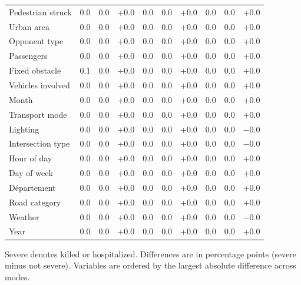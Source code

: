 \begin{table}[tp]
\begin{threeparttable}
{\begin{tabular}{lrrrrrrrrr}
Pedestrian struck & 0.0 & 0.0 & +0.0 & 0.0 & 0.0 & +0.0 & 0.0 & 0.0 & +0.0 \\
Urban area & 0.0 & 0.0 & +0.0 & 0.0 & 0.0 & +0.0 & 0.0 & 0.0 & +0.0 \\
Opponent type & 0.0 & 0.0 & +0.0 & 0.0 & 0.0 & +0.0 & 0.0 & 0.0 & +0.0 \\
Passengers & 0.0 & 0.0 & +0.0 & 0.0 & 0.0 & +0.0 & 0.0 & 0.0 & +0.0 \\
Fixed obstacle & 0.1 & 0.0 & +0.0 & 0.0 & 0.0 & +0.0 & 0.0 & 0.0 & +0.0 \\
Vehicles involved & 0.0 & 0.0 & +0.0 & 0.0 & 0.0 & +0.0 & 0.0 & 0.0 & +0.0 \\
Month & 0.0 & 0.0 & +0.0 & 0.0 & 0.0 & +0.0 & 0.0 & 0.0 & +0.0 \\
Transport mode & 0.0 & 0.0 & +0.0 & 0.0 & 0.0 & +0.0 & 0.0 & 0.0 & +0.0 \\
Lighting & 0.0 & 0.0 & +0.0 & 0.0 & 0.0 & +0.0 & 0.0 & 0.0 & $-$0.0 \\
Intersection type & 0.0 & 0.0 & +0.0 & 0.0 & 0.0 & +0.0 & 0.0 & 0.0 & $-$0.0 \\
Hour of day & 0.0 & 0.0 & +0.0 & 0.0 & 0.0 & +0.0 & 0.0 & 0.0 & +0.0 \\
Day of week & 0.0 & 0.0 & +0.0 & 0.0 & 0.0 & +0.0 & 0.0 & 0.0 & +0.0 \\
Département & 0.0 & 0.0 & +0.0 & 0.0 & 0.0 & +0.0 & 0.0 & 0.0 & +0.0 \\
Road category & 0.0 & 0.0 & +0.0 & 0.0 & 0.0 & +0.0 & 0.0 & 0.0 & +0.0 \\
Weather & 0.0 & 0.0 & +0.0 & 0.0 & 0.0 & +0.0 & 0.0 & 0.0 & $-$0.0 \\
Year & 0.0 & 0.0 & +0.0 & 0.0 & 0.0 & +0.0 & 0.0 & 0.0 & +0.0 \\
\bottomrule
\end{tabular}}
\begin{tablenotes}[flushleft]\footnotesize
\item Severe denotes killed or hospitalized. Differences are in percentage points (severe minus not severe). Variables are ordered by the largest absolute difference across modes.
\end{tablenotes}
\end{threeparttable}
\end{table}
